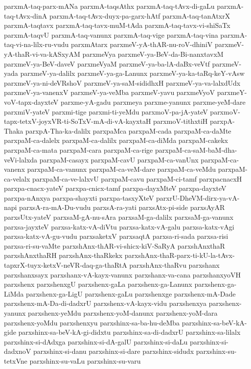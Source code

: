 {parxmA-taq-parx-mANa
parxmA-taqsAthx
parxmA-taq-tAvx-di-gaLu
parxmA-taq-tAvx-dinA
parxmA-taq-tAvx-duyx-pa-garx-hAtf
parxmA-taq-tanAtxrX
parxmA-taqtavx
parxmA-taq-tavx-muM-tAda
parxmA-taq-tavx-vi-shiSaTx
parxmA-taqvU
parxmA-taq-vanunx
parxmA-taq-vige
parxmA-taq-vina
parxmA-taq-vi-na-lilx-ru-vudu
parxmAtarx
parxmeV-yA-thAR-nu-roV-dhiniV
parxmeV-yA-thaR-vi-va-kASxyAM
parxmeVya
parxmeV-ya-BeV-da-Bi-nanxtavxM
parxmeV-ya-BeV-daveV
parxmeVyaM
parxmeV-ya-ba-lA-daBx-veVtf
parxmeV-yada
parxmeV-ya-dalilx
parxmeV-ya-ga-Lanunx
parxmeV-ya-ka-taRq-keY-vAsw
parxmeV-ya-ni-deVRshoV
parxmeV-ya-saM-sididhxH
parxmeV-ya-va-lalxdUdx
parxmeV-ya-vanenxV
parxmeV-ya-veMba
parxmeV-yavu
parxmeVyoV
parxmeY-voV-tapx-dayxteV
parxme-yA-gadu
parxmeya
parxme-yanunx
parxme-yeM-dare
parxmiV-yateV
parxmi-tige
parxmi-ti-yeMdu
parxmoV-pa-jA-yateV
parxmoV-tapx-tetxV-joyxVR-ti-SoTxV-mA-di-vA-kayxtaH
parxmoV-tithxtiH
parxpA-Thaka
parxpA-Tha-ka-dalilx
parxpaMca
parxpaM-cada
parxpaM-ca-daMte
parxpaM-ca-dalelx
parxpaM-ca-dalilx
parxpaM-ca-diMda
parxpaM-cakekx
parxpaM-ca-mata
parxpaM-cara
parxpaM-ca-rige
parxpaM-ca-saM-baM-dha-veVi-lalxda
parxpaM-casayx
parxpaM-cavU
parxpaM-ca-vanUnx
parxpaM-ca-vanenx
parxpaM-ca-vanunx
parxpaM-ca-veM-dare
parxpaM-ca-veMdu
parxpaM-ca-velalx
parxpaM-ca-ve-lalxvU
parxpaM-cavu
parxpaM-ci-tamf
parxpacnacxH
parxpa-cnacx-yateV
parxpa-cnicx-tamf
parxpa-dayxMteV
parxpa-dayxteV
parxpa-nAnxya
parxpa-shayxti
parxpa-tasxyXteV
parxrU-DheVM-dirx-ya-vA-napi
parxsA-ra-mA-Du-vudu
parxsA-ra-yati
parxsAtx-pi-side
parxsAyAR
parxsUtx-yateV
parxsaM-gA-nu-sAra
parxsaM-ga-dalilx
parxsaM-ga-vanunx
parxsa-jayxteV
parxsa-katx-vA-diVtu
parxsa-katx-vA-galu
parxsa-katx-vAgi
parxsa-katx-vA-gu-vudu
parxsaketxV
parxsaqtA
parxsa-ri-sada
parxsa-risi
parxsa-ri-su-vaMte
parxshAnx-thAR-vi-shicx-kiV-SaRyA
parxshAnxthaR
parxshAnxthaRH
parxshAnx-thaRkekx
parxshAnx-thaR-parx-ti-kU-la-tAvx-tapxrX-tuyx-ketxV-neVR-daq-ga-thaRtA
parxshAnx-thaRvu
parxshanx
parxshanxsayx
parxshanx-vA-kayx-vanunx
parxshanx-va-cana
parxshanxyoVH
parxshenx
parxshenxgU
parxshenx-gaLa
parxshenx-ga-Lanunx
parxshenx-ga-LiMda
parxshenx-ga-LigU
parxshenx-gaLu
parxshenxge
parxshenx-mA-Dade
parxshenx-mA-Da-di-dadxrU
parxshenx-vA-kayx-vidu
parxshenxya
parxshenx-yanunx
parxshenx-yeMdu
parxshenx-yoM-danunx
parxshenx-yoM-dara
parxshenx-yoMdu
parxshenxyu
parxshinx-sa-ba-hu-deMba
parxshinx-sa-beV-kA-gide
parxshinx-sa-beV-kA-gi-didxtu
parxshinx-sa-di-dadxrU
parxshinx-sa-lilalx
parxshinx-si-dAdxga
parxshinx-si-dA-galU
parxshinx-si-daLu
parxshinx-si-dadxnoV
parxshinx-si-danu
parxshinx-si-dare
parxshinx-sidudx
parxshinx-su-tetxVne
parxshinx-su-vaLu
parxshinx-su-varu
}
